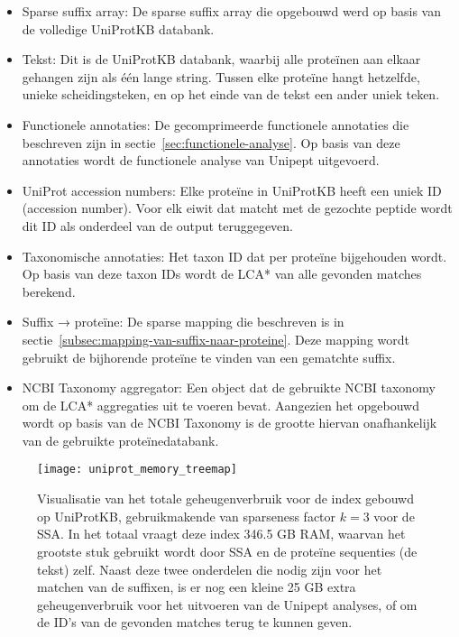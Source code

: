 \begin{itemize}
    \item Sparse suffix array: De sparse suffix array die opgebouwd werd op basis van de volledige UniProtKB databank.
    \item Tekst: Dit is de UniProtKB databank, waarbij alle proteïnen aan elkaar gehangen zijn als één lange string.
    Tussen elke proteïne hangt hetzelfde, unieke scheidingsteken, en op het einde van de tekst een ander uniek teken.
    \item Functionele annotaties: De gecomprimeerde functionele annotaties die beschreven zijn in sectie~\ref{sec:functionele-analyse}.
    Op basis van deze annotaties wordt de functionele analyse van Unipept uitgevoerd.
    \item UniProt accession numbers: Elke proteïne in UniProtKB heeft een uniek ID (accession number).
    Voor elk eiwit dat matcht met de gezochte peptide wordt dit ID als onderdeel van de output teruggegeven.
    \item Taxonomische annotaties: Het taxon ID dat per proteïne bijgehouden wordt.
    Op basis van deze taxon IDs wordt de LCA* van alle gevonden matches berekend.
    \item Suffix → proteïne: De sparse mapping die beschreven is in sectie~\ref{subsec:mapping-van-suffix-naar-proteine}.
    Deze mapping wordt gebruikt de bijhorende proteïne te vinden van een gematchte suffix.
    \item NCBI Taxonomy aggregator: Een object dat de gebruikte NCBI taxonomy om de LCA* aggregaties uit te voeren bevat.
    Aangezien het opgebouwd wordt op basis van de NCBI Taxonomy is de grootte hiervan onafhankelijk van de gebruikte proteïnedatabank.
\end{itemize}

\begin{figure}
    \centering
    \texttt{[image: uniprot\_memory\_treemap]}
    \caption{Visualisatie van het totale geheugenverbruik voor de index gebouwd op UniProtKB, gebruikmakende van sparseness factor $k = 3$ voor de SSA.
    In het totaal vraagt deze index 346.5 GB RAM, waarvan het grootste stuk gebruikt wordt door SSA en de proteïne sequenties (de tekst) zelf.
    Naast deze twee onderdelen die nodig zijn voor het matchen van de suffixen, is er nog een kleine 25 GB extra geheugenverbruik voor het uitvoeren van de Unipept analyses, of om de ID's van de gevonden matches terug te kunnen geven.}
    \label{fig:uniprot_memory_treemap}
\end{figure}

